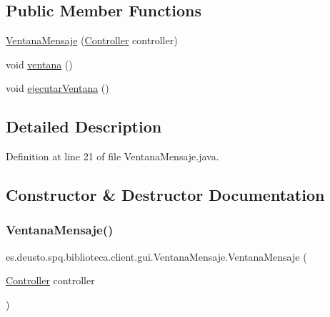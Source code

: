 \subsection*{Public Member Functions}
\begin{DoxyCompactItemize}
\item 
\mbox{\hyperlink{classes_1_1deusto_1_1spq_1_1biblioteca_1_1client_1_1gui_1_1_ventana_mensaje_a8538474416f67bac3e0077d5f2f25871}{Ventana\+Mensaje}} (\mbox{\hyperlink{classes_1_1deusto_1_1spq_1_1biblioteca_1_1controller_1_1_controller}{Controller}} controller)
\item 
void \mbox{\hyperlink{classes_1_1deusto_1_1spq_1_1biblioteca_1_1client_1_1gui_1_1_ventana_mensaje_a6e1e53edc811caa880731fd36f304bd2}{ventana}} ()
\item 
void \mbox{\hyperlink{classes_1_1deusto_1_1spq_1_1biblioteca_1_1client_1_1gui_1_1_ventana_mensaje_ac2c22018c35286343654d228dc5010cb}{ejecutar\+Ventana}} ()
\end{DoxyCompactItemize}


\subsection{Detailed Description}


Definition at line 21 of file Ventana\+Mensaje.\+java.



\subsection{Constructor \& Destructor Documentation}
\mbox{\label{classes_1_1deusto_1_1spq_1_1biblioteca_1_1client_1_1gui_1_1_ventana_mensaje_a8538474416f67bac3e0077d5f2f25871}} 
\subsubsection{\texorpdfstring{Ventana\+Mensaje()}{VentanaMensaje()}}
{\footnotesize\ttfamily es.\+deusto.\+spq.\+biblioteca.\+client.\+gui.\+Ventana\+Mensaje.\+Ventana\+Mensaje (\begin{DoxyParamCaption}\item[{\mbox{\hyperlink{classes_1_1deusto_1_1spq_1_1biblioteca_1_1controller_1_1_controller}{Controller}}}]{controller }\end{DoxyParamCaption})}

